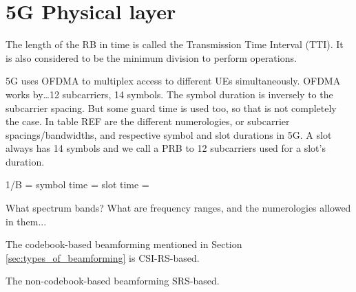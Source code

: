 \section{5G Physical layer}
\label{sec:5gphy}






The length of the RB in time is called the Transmission Time Interval
(TTI). It is also considered to be the minimum division to perform operations. 

5G uses \ac{OFDMA} to multiplex access to different UEs simultaneously. OFDMA works by\dots 12 subcarriers, 14 symbols. The symbol duration is inversely  to the subcarrier spacing. But some guard time is used too, so that is not completely the case. In table REF are the different numerologies, or subcarrier spacings/bandwidths, and respective symbol and slot durations in 5G. A slot always has 14 symbols and we call a \ac{PRB} to 12 subcarriers used for a slot's duration.

1/B = 
symbol time = 
slot time = 


What spectrum bands? What are frequency ranges, and the numerologies allowed in them...


The codebook-based beamforming mentioned in Section \ref{sec:types_of_beamforming} is CSI-RS-based.

The non-codebook-based beamforming SRS-based.




